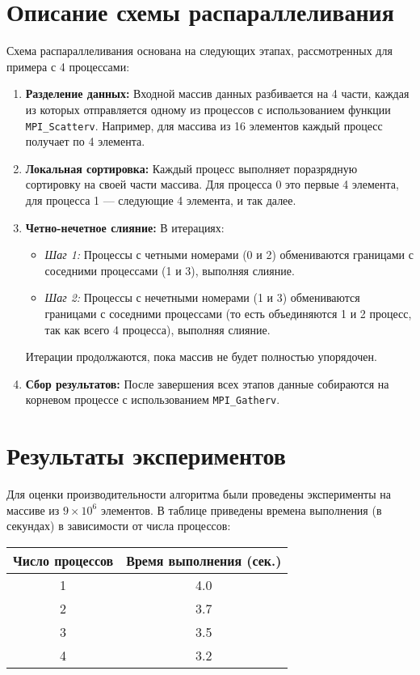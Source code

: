\documentclass[12pt]{article}
\begin{document}
\section{Описание схемы распараллеливания}
Схема распараллеливания основана на следующих этапах, рассмотренных для примера с 4 процессами:
\begin{enumerate}
    \item \textbf{Разделение данных:} Входной массив данных разбивается на 4 части, каждая из которых отправляется одному из процессов с использованием функции \texttt{MPI\_Scatterv}. Например, для массива из 16 элементов каждый процесс получает по 4 элемента.
    \item \textbf{Локальная сортировка:} Каждый процесс выполняет поразрядную сортировку на своей части массива. Для процесса 0 это первые 4 элемента, для процесса 1 — следующие 4 элемента, и так далее.
    \item \textbf{Четно-нечетное слияние:} В итерациях:
    \begin{itemize}
        \item \textit{Шаг 1:} Процессы с четными номерами (0 и 2) обмениваются границами с соседними процессами (1 и 3), выполняя слияние. 
        \item \textit{Шаг 2:} Процессы с нечетными номерами (1 и 3) обмениваются границами с соседними процессами (то есть объединяются 1 и 2 процесс, так как всего 4 процесса), выполняя слияние.
    \end{itemize}
    Итерации продолжаются, пока массив не будет полностью упорядочен.
    \item \textbf{Сбор результатов:} После завершения всех этапов данные собираются на корневом процессе с использованием \texttt{MPI\_Gatherv}.
\end{enumerate}

\section{Результаты экспериментов}
Для оценки производительности алгоритма были проведены эксперименты на массиве из $9 \times 10^6$ элементов. В таблице приведены времена выполнения (в секундах) в зависимости от числа процессов:

\begin{center}
\begin{tabular}{|c|c|}
\hline
\textbf{Число процессов} & \textbf{Время выполнения (сек.)} \\
\hline
1 & 4.0 \\
\hline
2 & 3.7 \\
\hline
3 & 3.5 \\
\hline
4 & 3.2 \\
\hline
\end{tabular}
\end{center}
\end{document}
